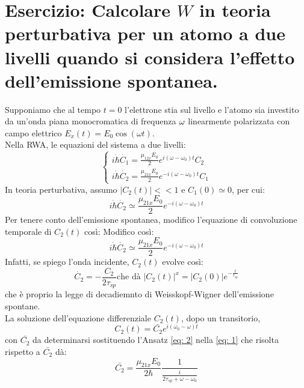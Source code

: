 \section*{Esercizio: Calcolare $W$ in teoria perturbativa per un atomo a due livelli quando si considera l'effetto dell'emissione spontanea.}
Supponiamo che al tempo $t = 0$ l'elettrone stia sul livello  e l'atomo sia investito da un'onda piana monocromatica di frequenza $\omega$ linearmente polarizzata con campo elettrico $E_x(t) = E_0 \cos(\omega t)$.\\
Nella RWA, le equazioni del sistema a due livelli:
\begin{equation*}
\begin{cases}
i \dot{\hbar} \dot{C_1} = \frac{\mu_{12x} E_0}{2} e^{i(\omega - \omega_0) t} C_2\\
i \dot{\hbar} \dot{C_2} = \frac{\mu_{21x} E_0}{2} e^{-i(\omega - \omega_0) t} C_1
\end{cases}
\end{equation*}
In teoria perturbativa, assumo $|C_2(t)| << 1$ e $C_1(0) \simeq 0$, per cui:
\begin{equation*}
i \dot{\hbar} \dot{C_2} \simeq \frac{\mu_{21x} E_0}{2} e^{-i(\omega - \omega_0) t}
\end{equation*}
Per tenere conto dell'emissione spontanea, modifico l'equazione di convoluzione temporale di $C_2(t)$ così:
Modifico così:
\begin{equation}\label{eq: 1}
i \dot{\hbar} \dot{C_2} \simeq \frac{\mu_{21x} E_0}{2} e^{-i(\omega - \omega_0) t}
\end{equation}
Infatti, se spiego l'onda incidente, $C_2(t)$ evolve così:
\begin{equation*}
\dot{C_2} = -\frac{C_2}{2 \tau_{sp}} \text{che dà } |C_2(t)|^x = |C_2(0)| e^{-\frac{t}{\tau_{sp}}}
\end{equation*}
che è proprio la legge di decadiemnto di Weisskopf-Wigner dell'emissione spontane.\\
La soluzione dell'equazione differenziale $C_2(t)$, dopo un transitorio, 
\begin{equation}\label{eq: 2}
C_2(t) = \bar{C_2} e^{i(\omega_0 - \omega) t}
\end{equation}
con $\bar{C_2}$ da determinarsi sostituendo l'Ansatz \eqref{eq: 2} nella \eqref{eq: 1} che risolta rispetto a $\bar{C_2}$ dà:
\begin{equation*}
\bar{C_2} = \frac{\mu_{21x} E_0}{2 \hbar} \frac{1}{\frac{i}{2 \tau_{sp} + \omega - \omega_0}}
\end{equation*}
